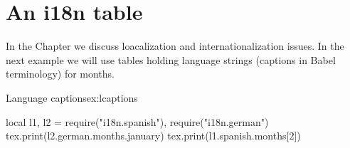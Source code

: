 \section{An i18n table}

In the Chapter  we discuss loacalization and internationalization issues. In the next example we will use tables holding language strings (captions in Babel terminology) for months. 

\begin{texexample}{Language captions}{ex:lcaptions}
\begin{luacode}
  local l1, l2 = require("i18n.spanish"), require("i18n.german")
  tex.print(l2.german.months.january)
  tex.print(l1.spanish.months[2])
\end{luacode}
\end{texexample}













